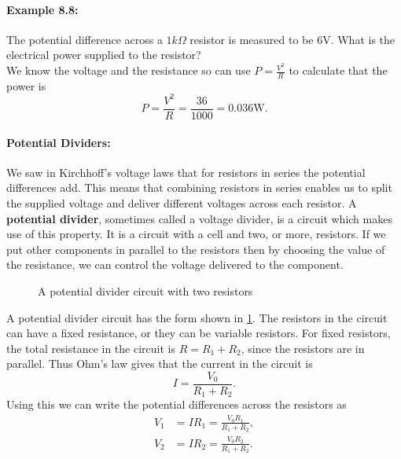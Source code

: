 \documentclass[a4paper,12pt]{book}
\begin{document}
\paragraph{Example 8.8:} The potential difference across a $1k\Omega$ resistor is measured to be $6\text{V}$. What is the electrical power supplied to the resistor?\\

We know the voltage and the resistance so can use $P=\frac{V^{2}}{R}$ to calculate that the power is
\begin{equation*}
P=\frac{V^{2}}{R}=\frac{36}{1000}=0.036\text{W}.
\end{equation*}


\paragraph{Potential Dividers:} We saw in Kirchhoff's voltage laws that for resistors in series the potential differences add. This means that combining resistors in series enables us to split the supplied voltage and deliver different voltages across each resistor. A \textbf{potential divider}, sometimes called a voltage divider, is a circuit which makes use of this property. It is a circuit with a cell and two, or more, resistors. If we put other components in parallel to the resistors then by choosing the value of the resistance, we can control the voltage delivered to the component.\\

  \begin{figure}[ht]
    \centering
    \caption{A potential divider circuit with two resistors}
    \label{fig: potential divider}
\end{figure}

A potential divider circuit has the form shown in \cref{fig: potential divider}. The resistors in the circuit can have a fixed resistance, or they can be variable resistors. For fixed resistors, the total resistance in the circuit is $R=R_{1}+R_{2}$, since the resistors are in parallel. Thus Ohm's law gives that the current in the circuit is
\begin{equation*}
I=\frac{V_{0}}{R_{1}+R_{2}}.
\end{equation*}
Using this we can write the potential differences across the resistors as
\begin{align*}
V_{1}&=IR_{1}=\frac{V_{0}R_{1}}{R_{1}+R_{2}},\\
V_{2}&=IR_{2}=\frac{V_{0}R_{2}}{R_{1}+R_{2}}.
\end{align*}
\end{document}

